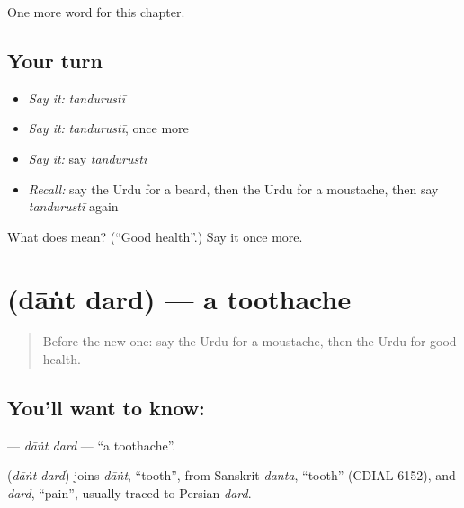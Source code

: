\begin{grammarlens}[title={What you've built}]
One more word for this chapter.
\end{grammarlens}

\subsection*{Your turn}
\begin{itemize}
\raggedright
  \item \emph{Say it:} \emph{tandurustī}
  \item \emph{Say it:} \emph{tandurustī}, once more
  \item \emph{Say it:} say \emph{tandurustī}
  \item \emph{Recall:} say the Urdu for a beard, then the Urdu for a moustache, then say \emph{tandurustī} again
\end{itemize}

\begin{tcolorbox}[breakable,colback=teal!4,colframe=teal!35!black,title={Before you move on}]
What does  mean? (\textquotedblleft{}Good health\textquotedblright{}.) Say it once more.
\end{tcolorbox}
\section[\texorpdfstring{\ur{دانت} \ur{درد} (dāṅt dard)}{دانت درد (dāṅt dard)}]{  (dāṅt dard) — a toothache}

\label{lesson:UR-C217-dant-dard}



\begin{quote}
Before the new one: say the Urdu for a moustache, then the Urdu for good health.
\end{quote}

\subsection*{You'll want to know:  }
\textbf{ } — \emph{dāṅt dard} — \textquotedblleft{}a toothache\textquotedblright{}.

\begin{cousinweb}
\textbf{ } (\emph{dāṅt dard}) joins \emph{dāṅt}, \textquotedblleft{}tooth\textquotedblright{}, from Sanskrit \emph{danta}, \textquotedblleft{}tooth\textquotedblright{} (CDIAL 6152), and \emph{dard}, \textquotedblleft{}pain\textquotedblright{}, usually traced to Persian \emph{dard}.
\end{cousinweb}

